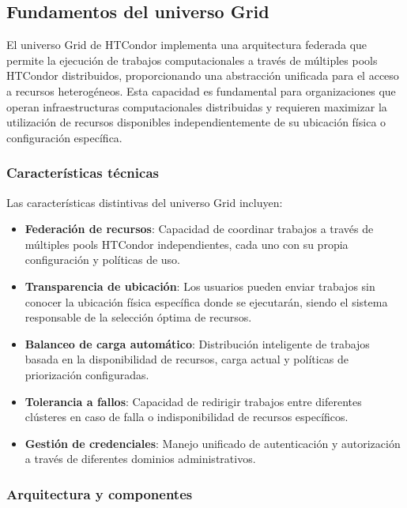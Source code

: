 \subsection{Fundamentos del universo Grid}
\noindent

El universo Grid de HTCondor implementa una arquitectura federada que permite la ejecución de trabajos computacionales a través de múltiples pools HTCondor distribuidos, proporcionando una abstracción unificada para el acceso a recursos heterogéneos. Esta capacidad es fundamental para organizaciones que operan infraestructuras computacionales distribuidas y requieren maximizar la utilización de recursos disponibles independientemente de su ubicación física o configuración específica.

\subsubsection{Características técnicas}
\noindent

Las características distintivas del universo Grid incluyen:

\begin{itemize}
	\item \textbf{Federación de recursos}: Capacidad de coordinar trabajos a través de múltiples pools HTCondor independientes, cada uno con su propia configuración y políticas de uso.
	
	\item \textbf{Transparencia de ubicación}: Los usuarios pueden enviar trabajos sin conocer la ubicación física específica donde se ejecutarán, siendo el sistema responsable de la selección óptima de recursos.
	
	\item \textbf{Balanceo de carga automático}: Distribución inteligente de trabajos basada en la disponibilidad de recursos, carga actual y políticas de priorización configuradas.
	
	\item \textbf{Tolerancia a fallos}: Capacidad de redirigir trabajos entre diferentes clústeres en caso de falla o indisponibilidad de recursos específicos.
	
	\item \textbf{Gestión de credenciales}: Manejo unificado de autenticación y autorización a través de diferentes dominios administrativos.
\end{itemize}

\subsubsection{Arquitectura y componentes}
\noindent

